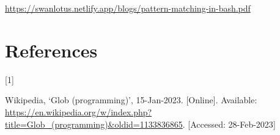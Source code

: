 \documentclass[
  a4paper,
]{article}
\newlength{\cslhangindent}
\newlength{\csllabelwidth}
\newlength{\cslentryspacingunit} %
\newenvironment{CSLReferences}[2] %
 {%
  \setlength{\parindent}{0pt}
  \ifodd #1
  \let\oldpar\par
  \def\par{\hangindent=\cslhangindent\oldpar}
  \fi
  \setlength{\parskip}{#2\cslentryspacingunit}
 }%
 {}
\newcommand{\CSLLeftMargin}[1]{\parbox[t]{\csllabelwidth}{#1}}
\newcommand{\CSLRightInline}[1]{\parbox[t]{\linewidth - \csllabelwidth}{#1}\break}
\begin{document}
\begin{ttfamily}

\begin{small}

\url{https://swanlotus.netlify.app/blogs/pattern-matching-in-bash.pdf}

\end{small}

\end{ttfamily}

\hypertarget{bibliography}{%
\section*{References}\label{bibliography}}

\hypertarget{refs}{}
\begin{CSLReferences}{0}{0}
\leavevmode{}%
\CSLLeftMargin{{[}1{]} }%
\CSLRightInline{Wikipedia, {`Glob (programming)'}, 15-Jan-2023.
{[}Online{]}. Available:
\url{https://en.wikipedia.org/w/index.php?title=Glob_(programming)\&oldid=1133836865}.
{[}Accessed: 28-Feb-2023{]}}

\end{CSLReferences}
\end{document}
